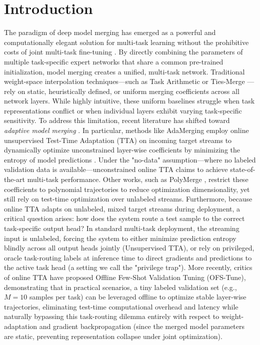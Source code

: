 \section{Introduction}
\label{sec:intro}

The paradigm of deep model merging has emerged as a powerful and computationally elegant solution for multi-task learning without the prohibitive costs of joint multi-task fine-tuning \cite{wortsman2022model,ilharco2022editing,jin2022dataless}.
By directly combining the parameters of multiple task-specific expert networks that share a common pre-trained initialization, model merging creates a unified, multi-task network.
Traditional weight-space interpolation techniques—such as Task Arithmetic \cite{ilharco2022editing} or Ties-Merge \cite{yadav2023ties}—rely on static, heuristically defined, or uniform merging coefficients across all network layers.
While highly intuitive, these uniform baselines struggle when task representations conflict or when individual layers exhibit varying task-specific sensitivity.
To address this limitation, recent literature has shifted toward \emph{adaptive model merging} \cite{adamerging,regcalmerge,polymerge}.
In particular, methods like AdaMerging \cite{adamerging} employ online unsupervised Test-Time Adaptation (TTA) on incoming target streams to dynamically optimize unconstrained layer-wise coefficients by minimizing the entropy of model predictions \cite{wang2020tent}.
Under the "no-data" assumption—where no labeled validation data is available—unconstrained online TTA claims to achieve state-of-the-art multi-task performance.
Other works, such as PolyMerge \cite{polymerge}, restrict these coefficients to polynomial trajectories to reduce optimization dimensionality, yet still rely on test-time optimization over unlabeled streams.
Furthermore, because online TTA adapts on unlabeled, mixed target streams during deployment, a critical question arises: how does the system route a test sample to the correct task-specific output head?
In standard multi-task deployment, the streaming input is unlabeled, forcing the system to either minimize prediction entropy blindly across all output heads jointly (Unsupervised TTA), or rely on privileged, oracle task-routing labels at inference time to direct gradients and predictions to the active task head (a setting we call the "privilege trap").
More recently, critics of online TTA have proposed Offline Few-Shot Validation Tuning (OFS-Tune), demonstrating that in practical scenarios, a tiny labeled validation set (e.g., $M=10$ samples per task) can be leveraged offline to optimize stable layer-wise trajectories, eliminating test-time computational overhead and latency while naturally bypassing this task-routing dilemma entirely with respect to weight-adaptation and gradient backpropagation (since the merged model parameters are static, preventing representation collapse under joint optimization).
